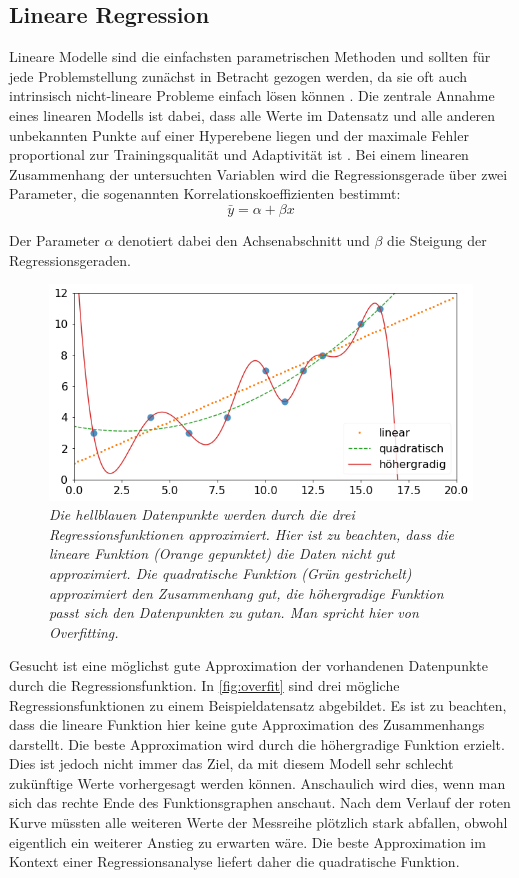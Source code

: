 \documentclass[
ngerman          %
,a4paper          %
,11pt
,pdftex
]{report}
\begin{document}
\subsection{Lineare Regression}
Lineare Modelle sind die einfachsten parametrischen Methoden und sollten für jede Problemstellung zunächst in Betracht gezogen werden, da sie oft auch intrinsisch nicht-lineare Probleme einfach lösen können \cite[72]{mlalgos}. Die zentrale Annahme eines linearen Modells ist dabei, dass alle Werte im Datensatz und alle anderen unbekannten Punkte auf einer Hyperebene liegen und der maximale Fehler proportional zur Trainingsqualität und Adaptivität ist \cite[73]{mlalgos}. Bei einem linearen Zusammenhang der untersuchten Variablen wird die Regressionsgerade über zwei Parameter, die sogenannten Korrelationskoeffizienten bestimmt:
\begin{equation}
	\bar{y} = \alpha + \beta x
\end{equation}

Der Parameter $\alpha$ denotiert dabei den Achsenabschnitt und $\beta$ die Steigung der Regressionsgeraden. \\
\par


\begin{figure}
	\centering
	\includegraphics[width=0.7\linewidth]{images/overfit}
	\caption[Anpassungsgrad der Regressionsfunktion.]{\textit{Die hellblauen Datenpunkte werden durch die drei Regressionsfunktionen approximiert. Hier ist zu beachten, dass die lineare Funktion (Orange gepunktet) die Daten nicht gut approximiert. Die quadratische Funktion (Grün gestrichelt) approximiert den Zusammenhang gut, die höhergradige Funktion passt sich den Datenpunkten \glqq zu gut\grqq an. Man spricht hier von Overfitting. }}
	\label{fig:overfit}
\end{figure}


Gesucht ist eine möglichst gute Approximation der vorhandenen Datenpunkte durch die Regressionsfunktion. In \autoref{fig:overfit} sind drei mögliche Regressionsfunktionen zu einem Beispieldatensatz abgebildet. Es ist zu beachten, dass die lineare Funktion hier keine gute Approximation des Zusammenhangs darstellt. Die beste Approximation wird durch die höhergradige Funktion erzielt. Dies ist jedoch nicht immer das Ziel, da mit diesem Modell sehr schlecht zukünftige Werte vorhergesagt werden können. Anschaulich wird dies, wenn man sich das rechte Ende des Funktionsgraphen anschaut. Nach dem Verlauf der roten Kurve müssten alle weiteren Werte der Messreihe plötzlich stark abfallen, obwohl eigentlich ein weiterer Anstieg zu erwarten wäre. Die beste Approximation im Kontext einer Regressionsanalyse liefert daher die quadratische Funktion.
\end{document}
